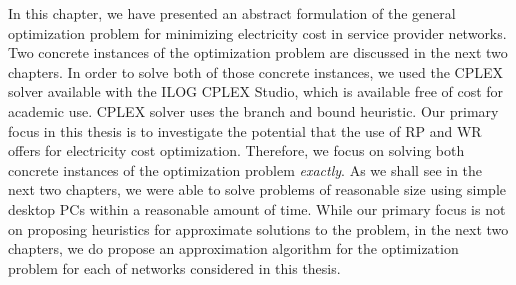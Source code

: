 In this chapter, we have presented an abstract formulation of the general optimization problem for minimizing electricity cost in service provider networks. Two concrete instances of the optimization problem are discussed in the next two chapters. In order to solve both of those concrete instances, we used the CPLEX solver available with the ILOG CPLEX Studio, which is available free of cost for academic use. CPLEX solver uses the branch and bound heuristic. Our primary focus in this thesis is to investigate the potential that the use of RP and WR offers for electricity cost optimization. Therefore, we focus on solving both concrete instances of the optimization problem \textit{exactly}. As we shall see in the next two chapters, we were able to solve problems of reasonable size using simple desktop PCs within a reasonable amount of time. While our primary focus is not on proposing heuristics for approximate solutions to the problem, in the next two chapters, we do propose an approximation algorithm for the optimization problem for each of networks considered in this thesis. 